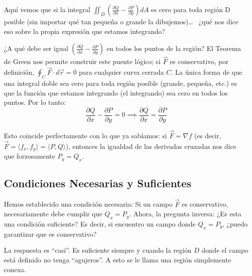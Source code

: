 Aquí vemos que si la integral $\iint_D \left( \frac{\partial Q}{\partial x} - \frac{\partial P}{\partial y} \right) dA$ es cero para toda región D posible (sin importar qué tan pequeña o grande la dibujemos)\dots~ ¿qué nos dice eso sobre la propia expresión que estamos integrando?

¿A qué debe ser igual $\left( \frac{\partial Q}{\partial x} - \frac{\partial P}{\partial y} \right)$ en todos los puntos de la región? El Teorema de Green nos permite construir este puente lógico; si $\vec{F}$ es conservativo, por definición, $\oint_C \vec{F} \cdot d\vec{r} = 0$ para cualquier curva cerrada $C$. La única forma de que una integral doble sea cero para toda región posible (grande, pequeña, etc.) es que la función que estamos integrando (el integrando) sea cero en todos los puntos.
Por lo tanto:
$$\frac{\partial Q}{\partial x} - \frac{\partial P}{\partial y} = 0 \implies \frac{\partial Q}{\partial x} = \frac{\partial P}{\partial y}$$

Esto coincide perfectamente con lo que ya sabíamos: si $\vec{F} = \nabla f$ (es decir, $\vec{F} = \langle f_x, f_y \rangle = \langle P, Q \rangle$), entonces la igualdad de las derivadas cruzadas nos dice que forzosamente $P_y = Q_x$.

\subsection{Condiciones Necesarias y Suficientes}

Hemos establecido una condición necesaria: Si un campo $\vec{F}$ es conservativo, necesariamente debe cumplir que $Q_x = P_y$. Ahora, la pregunta inversa: ¿Es esta una condición suficiente? Es decir, si encuentro un campo donde $Q_x = P_y$, ¿puedo garantizar que es conservativo?

La respuesta es ``casi''. Es suficiente siempre y cuando la región $D$ donde el campo está definido no tenga ``agujeros''. A esto se le llama una región simplemente conexa.
